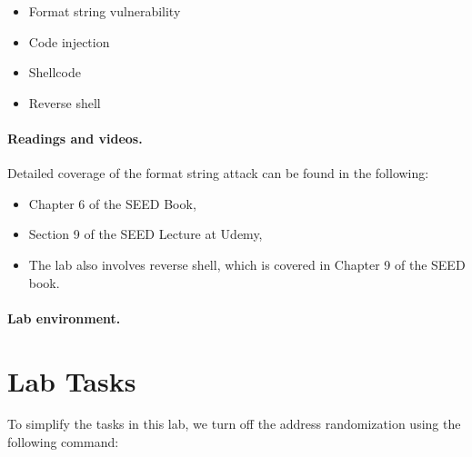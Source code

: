 \begin{itemize}[noitemsep]
\item Format string vulnerability
\item Code injection
\item Shellcode 
\item Reverse shell 
\end{itemize}


\noindent
{}


\paragraph{Readings and videos.}
Detailed coverage of the format string attack can be found in the following:

\begin{itemize}
\item Chapter 6 of the SEED Book, \seedbook
\item Section 9 of the SEED Lecture at Udemy, \seedcsvideo
\item The lab also involves reverse shell, which is covered in Chapter 9 of the SEED book.
\end{itemize}



\paragraph{Lab environment.} \seedenvironment




\newpage
\section{Lab Tasks}

To simplify the tasks in this lab, we turn off the address randomization
using the following command: 

